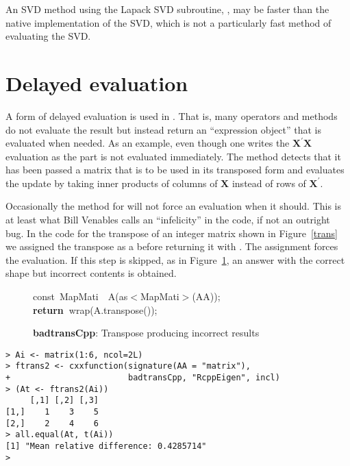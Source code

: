 \documentclass[shortnames,article]{jss}
\newcommand{\hlstd}[1]{\textcolor[rgb]{0,0,0}{#1}}
\newcommand{\hlopt}[1]{\textcolor[rgb]{0,0,0}{#1}}
\newcommand{\hlkwa}[1]{\textcolor[rgb]{0.61,0.13,0.93}{\bf{#1}}}
\newcommand{\hlkwb}[1]{\textcolor[rgb]{0.13,0.54,0.13}{#1}}
\newcommand{\hlkwd}[1]{\textcolor[rgb]{0,0,0}{#1}}
\begin{document}
An SVD method using the Lapack SVD subroutine, , may be
faster than the native  implementation of the SVD, which is
not a particularly fast method of evaluating the SVD.

\section{Delayed evaluation}
\label{sec:delayed}

A form of delayed evaluation is used in .  That is, many
operators and methods do not evaluate the result but instead return an
``expression object'' that is evaluated when needed.  As an example,
even though one writes the $\bm X^\prime\bm X$ evaluation as
 the  part is not
evaluated immediately.  The  method detects that it
has been passed a matrix that is to be used in its transposed form and
evaluates the update by taking inner products of columns of $\bm X$
instead of rows of $\bm X^\prime$.

Occasionally the method for  will not force an
evaluation when it should.  This is at least what Bill Venables calls
an ``infelicity'' in the code, if not an outright bug.  In the code
for the transpose of an integer matrix shown in Figure~\ref{trans} we
assigned the transpose as a  before returning it with
.  The assignment forces the evaluation.  If this
step is skipped, as in Figure~\ref{badtrans}, an answer with the correct
shape but incorrect contents is obtained.

\begin{figure}[htb]
  \noindent
  \ttfamily
  \hlstd{}\hlkwb{const\ }\hlstd{MapMati}\hlstd{\ \ }\hlstd{}\hlkwd{A}\hlstd{}\hlopt{(}\hlstd{as}\hlopt{$<$}\hlstd{MapMati}\hlopt{$>$(}\hlstd{AA}\hlopt{));}\hspace*{\fill}\\
  \hlstd{}\hlkwa{return\ }\hlstd{}\hlkwd{wrap}\hlstd{}\hlopt{(}\hlstd{A}\hlopt{.}\hlstd{}\hlkwd{transpose}\hlstd{}\hlopt{());}\hlstd{}\hspace*{\fill}\\
  \mbox{}
  \normalfont
  \normalsize
  \caption{\textbf{badtransCpp}: Transpose producing incorrect results}
  \label{badtrans}
\end{figure}
\begin{verbatim}
> Ai <- matrix(1:6, ncol=2L)
> ftrans2 <- cxxfunction(signature(AA = "matrix"), 
+                        badtransCpp, "RcppEigen", incl)
> (At <- ftrans2(Ai))
     [,1] [,2] [,3]
[1,]    1    3    5
[2,]    2    4    6
> all.equal(At, t(Ai))
[1] "Mean relative difference: 0.4285714"
> 
\end{verbatim}
\end{document}
